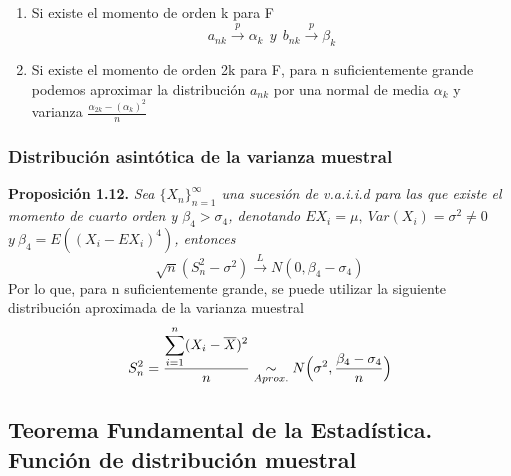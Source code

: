	\begin{enumerate}
		\item Si existe el momento de orden k para F $$a_{nk}\xrightarrow{p}\alpha _k\ \ y\  \ b_{nk}\xrightarrow{p}\beta_k$$
		
		\item Si existe el momento de orden 2k para F, para n suficientemente grande podemos aproximar la distribución $a_{nk}$ por una normal de media $\alpha_k$ y varianza $\frac{\alpha_{2k}-(\alpha_k)^{2}}{n}$
	\end{enumerate}

	\subsubsection{Distribución asintótica de la varianza muestral}
	
	\noindent\textbf{Proposición 1.12. }\textit{Sea $\{X_n\}^{\infty}_{n=1}$ una sucesión de v.a.i.i.d para las que existe el momento de cuarto orden y $\beta_4>\sigma_4$, denotando $EX_i=\mu,\ Var(X_i)=\sigma^{2}\neq 0\ $\linebreak$y\ \beta_4=E((X_i-EX_i)^{4})$, entonces }$$\sqrt{n}(S^{2}_{n}-\sigma^{2})\xrightarrow{L}N(0, \beta_4-\sigma_4)$$ Por lo que, para n suficientemente grande, se puede utilizar la siguiente distribución aproximada de la varianza muestral $$S^{2}_{n}=\frac{\displaystyle\sum_{i=1}^{n}(X_i-\overline{X})^{2}}{n}\underset{Aprox.}{\sim}N\Bigl(\sigma^{2},\frac{\beta_4-\sigma_4}{n}\Bigr)$$
	
	\pagebreak
	
	\subsection{Teorema Fundamental de la Estadística. Función de distribución muestral}
	
